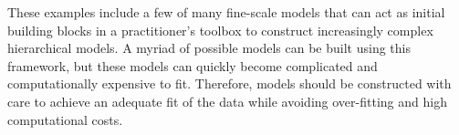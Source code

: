 These examples include a few of many fine-scale models that can act as initial building blocks in a practitioner's toolbox to construct increasingly complex hierarchical models. 
A myriad of possible models can be built using this framework, but these models can quickly become complicated and computationally expensive to fit. Therefore, models should be constructed with care to achieve an adequate fit of the data while avoiding over-fitting and high computational costs.